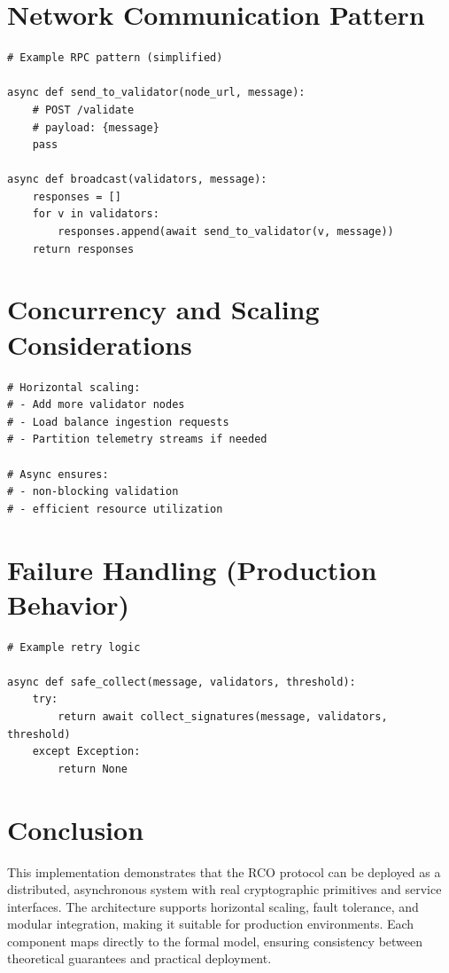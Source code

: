 \section{Network Communication Pattern}

\begin{verbatim}
# Example RPC pattern (simplified)

async def send_to_validator(node_url, message):
    # POST /validate
    # payload: {message}
    pass

async def broadcast(validators, message):
    responses = []
    for v in validators:
        responses.append(await send_to_validator(v, message))
    return responses
\end{verbatim}

\section{Concurrency and Scaling Considerations}

\begin{verbatim}
# Horizontal scaling:
# - Add more validator nodes
# - Load balance ingestion requests
# - Partition telemetry streams if needed

# Async ensures:
# - non-blocking validation
# - efficient resource utilization
\end{verbatim}

\section{Failure Handling (Production Behavior)}

\begin{verbatim}
# Example retry logic

async def safe_collect(message, validators, threshold):
    try:
        return await collect_signatures(message, validators, threshold)
    except Exception:
        return None
\end{verbatim}

\section{Conclusion}

This implementation demonstrates that the RCO protocol can be deployed as a distributed, asynchronous system with real cryptographic primitives and service interfaces. The architecture supports horizontal scaling, fault tolerance, and modular integration, making it suitable for production environments. Each component maps directly to the formal model, ensuring consistency between theoretical guarantees and practical deployment.

